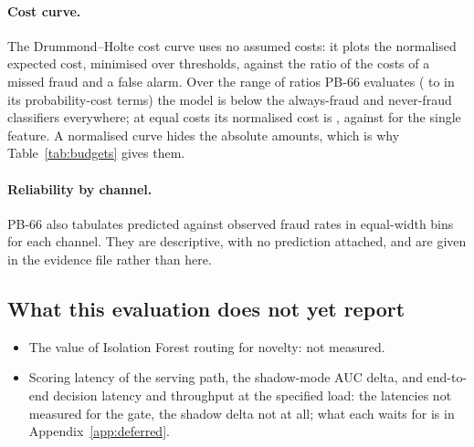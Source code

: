 \paragraph{Cost curve.} The Drummond--Holte cost curve uses no assumed costs: it plots the normalised
expected cost, minimised over thresholds, against the ratio of the costs of a missed fraud and a false
alarm. Over the range of ratios PB-66 evaluates (\nPbDHLow{} to \nPbDHHigh{} in its probability-cost
terms) the model is below the always-fraud and never-fraud classifiers everywhere; at equal costs its normalised cost is \nPbDHModel{},
against \nPbDHBase{} for the single feature. A normalised curve hides the absolute amounts, which is
why Table~\ref{tab:budgets} gives them.

\paragraph{Reliability by channel.} PB-66 also tabulates predicted against observed fraud rates in
equal-width bins for each channel. They are descriptive, with no prediction attached, and are given
in the evidence file rather than here.

\subsection{What this evaluation does not yet report}

\begin{itemize}
  \item The value of Isolation Forest routing for novelty: not measured.
  \item Scoring latency of the serving path, the shadow-mode AUC delta, and end-to-end decision
        latency and throughput at the specified load: the latencies not measured for the gate, the
        shadow delta not at all; what each waits for is in Appendix~\ref{app:deferred}.
\end{itemize}
